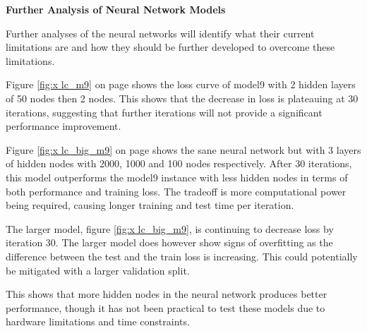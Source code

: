 \textbf{Further Analysis of Neural Network Models}
\label{fannm}

Further analyses of the neural networks will identify what their current limitations are and how they should be further developed to overcome these limitations.

Figure \ref{fig:x lc_m9} on page \pageref{fig:x lc_m9} shows the loss curve of model9 with 2 hidden layers of 50 nodes then 2 nodes. This shows that the decrease in loss is plateauing at 30 iterations, suggesting that further iterations will not provide a significant performance improvement. 

Figure \ref{fig:x lc_big_m9} on page \pageref{fig:x lc_big_m9} shows the sane neural network but with 3 layers of hidden nodes with 2000, 1000 and 100 nodes respectively. After 30 iterations, this model outperforms the model9 instance with less hidden nodes in terms of both performance and training loss. The tradeoff is more computational power being required, causing longer training and test time per iteration. 

The larger model, figure \ref{fig:x lc_big_m9}, is continuing to decrease loss by iteration 30. The larger model does however show signs of overfitting as the difference between the test and the train loss is increasing. This could potentially be mitigated with a larger validation split.  

This shows that more hidden nodes in the neural network produces better performance, though it has not been practical to test these models due to hardware limitations and time constraints.

